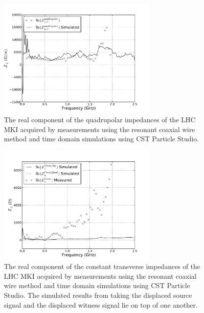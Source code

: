\begin{figure}
\begin{center}
\includegraphics[width=0.7\textwidth]{LHC_MKI/figures/mki_15_sims_meas_quad_horz.pdf}
\end{center}
\caption{The real component of the quadrupolar impedances of the LHC MKI acquired by measurements using the resonant coaxial wire method and time domain simulations using CST Particle Studio.}
\label{fig:mki-15-quadrupolar}
\end{figure}

\begin{figure}
\begin{center}
\includegraphics[width=0.7\textwidth]{LHC_MKI/figures/mki_15_sims_meas_const.pdf}
\end{center}
\caption{The real component of the constant transverse impedances of the LHC MKI acquired by measurements using the resonant coaxial wire method and time domain simulations using CST Particle Studio. The simulated results from taking the displaced source signal and the displaced witness signal lie on top of one another.}
\label{fig:mki-15-constant}
\end{figure}


